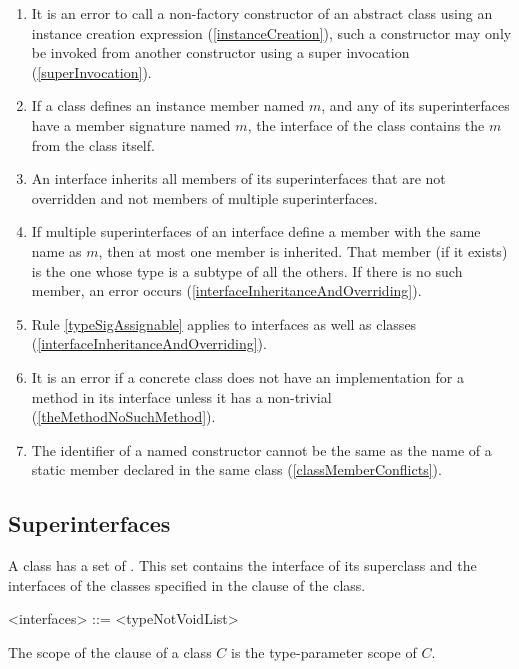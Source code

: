 \documentclass[makeidx]{article}
\begin{document}
{\begin{enumerate}
  of its interface, and there is no non-trivial 
  (\ref{classes}).
\item It is an error to call a non-factory constructor of an abstract class
  using an instance creation expression (\ref{instanceCreation}),
  such a constructor may only be invoked from another constructor
  using a super invocation (\ref{superInvocation}).
\item If a class defines an instance member named $m$,
  and any of its superinterfaces have a member signature named $m$,
  the interface of the class contains the $m$ from the class itself.
\item An interface inherits all members of its superinterfaces
  that are not overridden and not members of multiple superinterfaces.
\item If multiple superinterfaces of an interface
  define a member with the same name as $m$,
  then at most one member is inherited.
  That member (if it exists) is the one whose type is a subtype
  of all the others.
  If there is no such member, an error occurs
  (\ref{interfaceInheritanceAndOverriding}).
\item Rule \ref{typeSigAssignable} applies to interfaces as well as classes
  (\ref{interfaceInheritanceAndOverriding}).
\item It is an error if a concrete class does not have an implementation
  for a method in its interface
  unless it has a non-trivial 
  (\ref{theMethodNoSuchMethod}).
\item The identifier of a named constructor cannot be
  the same as the name of a static member declared in the same class
  (\ref{classMemberConflicts}).
\end{enumerate}
}


\subsection{Superinterfaces}

\LMHash{}%
A class has a set of .
This set contains the interface of its superclass
and the interfaces of the classes specified in
the \IMPLEMENTS{} clause of the class.

\begin{grammar}
<interfaces> ::= \IMPLEMENTS{} <typeNotVoidList>
\end{grammar}

\LMHash{}%
The scope of the \IMPLEMENTS{} clause of a class $C$ is the type-parameter scope of $C$.
\end{document}
